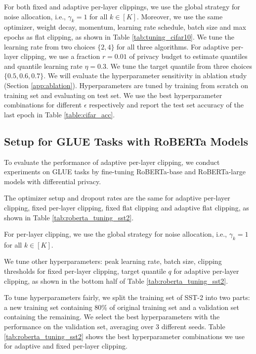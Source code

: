 For both fixed and adaptive per-layer clippings, we use the global strategy for noise allocation, i.e.,  $\gamma_k=1$ for all $k\in [K]$. Moreover, we use the same optimizer, weight decay, momentum, learning rate schedule, batch size and max epochs as flat clipping, as shown in Table \ref{tab:tuning_cifar10}. We tune the learning rate from two choices $\{2,4\}$ for all three algorithms. For adaptive per-layer clipping, we use a fraction $r=0.01$ of privacy budget to estimate quantiles and quantile learning rate $\eta=0.3$. We tune the target quantile from three choices $\{0.5, 0.6, 0.7\}$. We will evaluate the hyperparameter sensitivity in ablation study (Section \ref{app:ablation}).
Hyperparameters are tuned by training from scratch on training set and evaluating on test set. We use the best hyperparameter combinations for different $\epsilon$ respectively and report the test set accuracy of the last epoch in Table \ref{table:cifar_acc}.
 

 


\subsection{Setup for GLUE Tasks with RoBERTa Models } \label{app:glue}

To evaluate the performance of adaptive per-layer clipping, we conduct experiments on GLUE tasks by fine-tuning RoBERTa-base and RoBERTa-large models with differential privacy.

The optimizer setup and dropout rates are the same for adaptive per-layer clipping, fixed per-layer clipping, fixed flat clipping and adaptive flat clipping, as shown in Table \ref{tab:roberta_tuning_sst2}.

For per-layer clipping, we use the global strategy for noise allocation, i.e., $\gamma_k=1$ for all $k\in [K]$.

We tune other hyperparameters: peak learning rate, batch size, clipping thresholds for fixed per-layer clipping, target quantile $q$ for adaptive per-layer clipping, as shown in the bottom half of Table \ref{tab:roberta_tuning_sst2}.

To tune hyperparameters fairly, we split the training set of SST-2 into two parts: a new training set containing 80\% of original training set and a validation set containing the remaining. 
We select the best hyperparameters with the performance on the validation set, averaging over 3 different seeds. 
Table \ref{tab:roberta_tuning_sst2} shows the best hyperparameter combinations we use for adaptive and fixed per-layer clipping.

